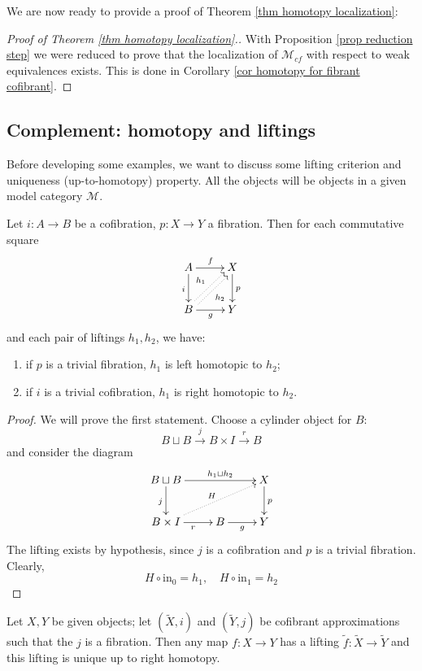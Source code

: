 We are now ready to provide a proof of Theorem \ref{thm homotopy localization}:

\begin{proof}[Proof of Theorem \ref{thm homotopy localization}.]
With Proposition \ref{prop reduction step} we were reduced to prove that the localization of $\mathcal M_{cf}$ with respect to weak equivalences exists. This is done in Corollary \ref{cor homotopy for fibrant cofibrant}.
\end{proof}

\subsection{Complement: homotopy and liftings}

Before developing some examples, we want to discuss some lifting criterion and uniqueness (up-to-homotopy) property. All the objects will be objects in a given model category $\mathcal M$.

\begin{prop} \label{prop lifting up to homotopy}
Let $i \colon A \to B$ be a cofibration, $p \colon X \to Y$ a fibration. Then for each commutative square
\[
\xymatrix{
A \ar[d]_i \ar[r]^f & X \ar[d]^p \\ B \ar[r]_g \ar@<.5ex>@{.>}[ur]^{h_1} \ar@<-.5ex>@{.>}[ur]_{h_2} & Y
}
\]
and each pair of liftings $h_1,h_2$, we have:
\begin{enumerate}
\item if $p$ is a trivial fibration, $h_1$ is left homotopic to $h_2$;
\item if $i$ is a trivial cofibration, $h_1$ is right homotopic to $h_2$.
\end{enumerate}
\end{prop}

\begin{proof}
We will prove the first statement. Choose a cylinder object for $B$:
\[
B \sqcup B \xrightarrow{j} B \times I \xrightarrow{r} B
\]
and consider the diagram
\[
\xymatrix{
B \sqcup B \ar[d]_j \ar[rr]^-{h_1 \sqcup h_2} & & X \ar[d]^p \\ B \times I \ar@{.>}[urr]^H \ar[r]_r & B \ar[r]_g & Y
}
\]
The lifting exists by hypothesis, since $j$ is a cofibration and $p$ is a trivial fibration. Clearly,
\[
H \circ \mathrm{in}_0 = h_1, \quad H \circ \mathrm{in}_1 = h_2
\]
\end{proof}

\begin{cor} \label{cor lifting between approximations}
Let $X,Y$ be given objects; let $(\widetilde{X},i)$ and $(\widetilde{Y},j)$ be cofibrant approximations such that the $j$ is a fibration. Then any map $f \colon X \to Y$ has a lifting $\widetilde{f} \colon \widetilde{X} \to \widetilde{Y}$ and this lifting is unique up to right homotopy.
\end{cor}

